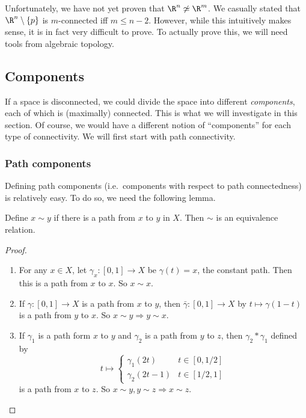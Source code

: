 \documentclass[a4paper]{article}
\begin{document}
Unfortunately, we have not yet proven that $\R^n \not\simeq \R^m$. We casually stated that $\R^n \setminus \{p\}$ is $m$-connected iff $m \leq n - 2$. However, while this intuitively makes sense, it is in fact very difficult to prove. To actually prove this, we will need tools from algebraic topology.

\subsection{Components}
If a space is disconnected, we could divide the space into different \emph{components}, each of which is (maximally) connected. This is what we will investigate in this section. Of course, we would have a different notion of ``components'' for each type of connectivity. We will first start with path connectivity.

\subsubsection{Path components}
Defining path components (i.e.\ components with respect to path connectedness) is relatively easy. To do so, we need the following lemma.

\begin{lemma}
  Define $x\sim y$ if there is a path from $x$ to $y$ in $X$. Then $\sim$ is an equivalence relation.
\end{lemma}

\begin{proof}\leavevmode
  \begin{enumerate}
    \item For any $x\in X$, let $\gamma_x: [0, 1] \to X$ be $\gamma(t) = x$, the constant path. Then this is a path from $x$ to $x$. So $x\sim x$.
    \item If $\gamma: [0, 1] \to X$ is a path from $x$ to $y$, then $\bar \gamma: [0, 1] \to X$ by $t \mapsto \gamma(1 - t)$ is a path from $y$ to $x$. So $x\sim y \Rightarrow y\sim x$.
    \item If $\gamma_1$ is a path form $x$ to $y$ and $\gamma_2$ is a path from $y$ to $z$, then $\gamma_2*\gamma_1$ defined by
      \[
        t\mapsto
        \begin{cases}
          \gamma_1(2t) & t\in [0, 1/2]\\
          \gamma_2(2t - 1) & t\in [1/2, 1]
        \end{cases}
      \]
      is a path from $x$ to $z$. So $x\sim y, y\sim z \Rightarrow x\sim z$.
  \end{enumerate}
\end{proof}
\end{document}
